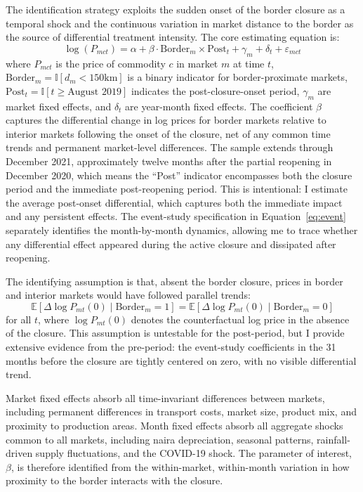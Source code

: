 \documentclass[12pt]{article}
\newcommand{\E}{\mathbb{E}}
\newcommand{\ind}{\mathbb{I}}
\begin{document}
The identification strategy exploits the sudden onset of the border closure as a temporal shock and the continuous variation in market distance to the border as the source of differential treatment intensity. The core estimating equation is:
\begin{equation}
\label{eq:main}
\log(P_{mct}) = \alpha + \beta \cdot \text{Border}_m \times \text{Post}_t + \gamma_m + \delta_t + \varepsilon_{mct}
\end{equation}
where $P_{mct}$ is the price of commodity $c$ in market $m$ at time $t$, $\text{Border}_m = \ind[d_m < 150\text{km}]$ is a binary indicator for border-proximate markets, $\text{Post}_t = \ind[t \geq \text{August 2019}]$ indicates the post-closure-onset period, $\gamma_m$ are market fixed effects, and $\delta_t$ are year-month fixed effects. The coefficient $\beta$ captures the differential change in log prices for border markets relative to interior markets following the onset of the closure, net of any common time trends and permanent market-level differences. The sample extends through December 2021, approximately twelve months after the partial reopening in December 2020, which means the ``Post'' indicator encompasses both the closure period and the immediate post-reopening period. This is intentional: I estimate the average post-onset differential, which captures both the immediate impact and any persistent effects. The event-study specification in Equation~\ref{eq:event} separately identifies the month-by-month dynamics, allowing me to trace whether any differential effect appeared during the active closure and dissipated after reopening.

The identifying assumption is that, absent the border closure, prices in border and interior markets would have followed parallel trends:
\begin{equation}
\E[\Delta \log P_{mt}(0) \mid \text{Border}_m = 1] = \E[\Delta \log P_{mt}(0) \mid \text{Border}_m = 0]
\end{equation}
for all $t$, where $\log P_{mt}(0)$ denotes the counterfactual log price in the absence of the closure. This assumption is untestable for the post-period, but I provide extensive evidence from the pre-period: the event-study coefficients in the 31 months before the closure are tightly centered on zero, with no visible differential trend.

Market fixed effects absorb all time-invariant differences between markets, including permanent differences in transport costs, market size, product mix, and proximity to production areas. Month fixed effects absorb all aggregate shocks common to all markets, including naira depreciation, seasonal patterns, rainfall-driven supply fluctuations, and the COVID-19 shock. The parameter of interest, $\beta$, is therefore identified from the within-market, within-month variation in how proximity to the border interacts with the closure.
\end{document}

